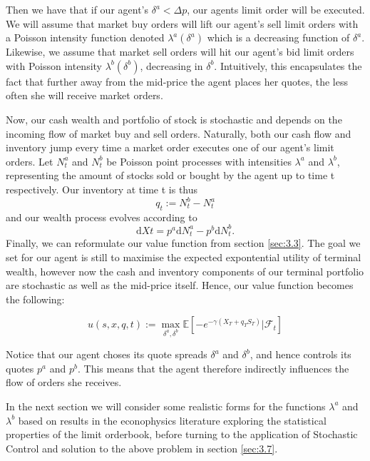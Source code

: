 Then we have that if our agent's $\delta^a < \Delta p$, our agents 
limit order will be executed. We will assume that market buy orders
will lift our agent's sell limit orders with a Poisson intensity function
denoted $\lambda^a(\delta^a)$ which is a decreasing function of $\delta^a$.
Likewise, we assume that market sell orders will hit our agent's bid 
limit orders with Poisson intensity $\lambda^b(\delta^b)$, decreasing
in $\delta^b$. Intuitively, this encapsulates the fact that further 
away from the mid-price the agent places her quotes, the less often she
will receive market orders.

Now, our cash wealth and portfolio of stock is stochastic and depends
on the incoming flow of market buy and sell orders. Naturally, both
our cash flow and inventory jump every time a market order executes 
one of our agent's limit orders. Let $N^a_t$ and $N^b_t$ be Poisson 
point processes with intensities $\lambda^a$ and $\lambda^b$, 
representing the amount of stocks sold or bought by the agent up to 
time t respectively. Our inventory at time t is thus 
\begin{equation}
    q_t:=N^b_t-N^a_t
\end{equation} 
and our wealth process evolves according to
\begin{equation}
    \mathrm dXt=p^a\mathrm dN^a_t-p^b\mathrm dN^b_t.
\end{equation}
Finally, we can reformulate our value function from section \ref{sec:3.3}.
The goal we set for our agent is still to maximise the expected 
expontential utility of terminal wealth, however now the cash and 
inventory components of our terminal portfolio are stochastic as 
well as the mid-price itself. Hence, our value function becomes 
the following:
\begin{definition}
    \begin{equation}\label{eq:3.12}
        u(s,x,q,t):=\max\limits_{\delta^a,\delta^b}\mathbb{E}\left[-e^{-\gamma(X_T+q_TS_T)}|\mathcal{F}_t\right]
    \end{equation}
\end{definition}

Notice that our agent choses its quote spreads $\delta^a$ and $\delta^b$,
and hence controls its quotes $p^a$ and $p^b$. This means that the 
agent therefore indirectly influences the flow of orders she receives.

In the next section we will consider some realistic forms for the functions
$\lambda^a$ and $\lambda^b$ based on results in the econophysics literature
exploring the statistical properties of the limit orderbook, before 
turning to the application of Stochastic Control and solution to the 
above problem in section \ref{sec:3.7}.

